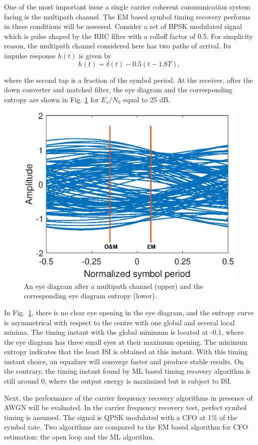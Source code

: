 \documentclass[journal,comsoc, onecolumn, 12pt,draftclsnofoot]{IEEEtran} %
\begin{document}
One of the most important issue a single carrier coherent communication system facing is the multipath channel.
The EM based symbol timing recovery performs in these conditions will be assessed.
Consider a set of BPSK modulated signal which is pulse shaped by the RRC filter with  a rolloff factor of 0.5.
For simplicity reason, the multipath channel considered here has two paths of arrival.
Its impulse response $h(t)$ is given by
\begin{equation}
h(t)=\delta(t)-0.5(t-1.8T),
\end{equation}

\noindent where the second tap is a fraction of the symbol period.  
At the receiver, after the down converter and matched filter, the eye diagram and the corresponding entropy are shown in Fig. \ref{fig:per_timing_isi} for \(E_s/N_0\) equal to 25 dB. 
\begin{figure}[ht]
\centering
\includegraphics[width=3 in]{pic/per_timing_multi.eps}
\caption{An eye diagram after a multipath channel (upper) and the corresponding eye diagram entropy (lower).}
\label{fig:per_timing_isi} 
\end{figure} 

In Fig.~\ref{fig:per_timing_isi}, there is no clear eye opening in the eye diagram, and the entropy curve is asymmetrical with respect to the centre with one global and several local minima. 
The timing instant with the global minimum is located at -0.1, where the eye diagram has three small eyes at their maximum opening.
The minimum entropy indicates that the least ISI is obtained at this instant.
With this timing instant choice, an equalizer will converge faster and produce stable results.
On the contrary, the timing instant found by ML based timing recovery algorithm is still around 0, 
where the output energy is maximized but is subject to ISI.

Next, the performance of the carrier frequency recovery algorithms in presence of AWGN will be evaluated.
In the carrier frequency recovery test, perfect symbol timing is assumed.
The signal is QPSK modulated with a CFO at 1\% of the symbol rate.
Two algorithms are compared to the EM based algorithm for CFO estimation:
the open loop and the ML algorithm.
\end{document}
